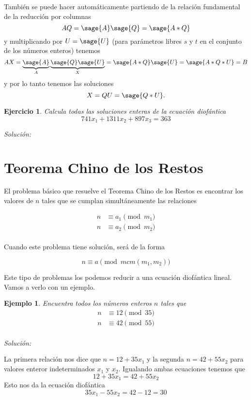 \documentclass{amsart}
\newtheorem{ejer}{Ejercicio}
\newtheorem{ejem}{Ejemplo}
\begin{document}
También se puede hacer automáticamente partiendo de la relación fundamental 
de la reducción por columnas
$$ AQ = \sage{A} \sage{Q} = \sage{A*Q} $$
y multiplicando por $U = \sage{U}$ (para parámetros libres $s$ y $t$ en el conjunto de los números enteros) tenemos
$$ AX = \underbrace{\sage{A}}_A \underbrace{\sage{Q} \sage{U}}_X = \sage{A*Q} \sage{U} = \sage{A*Q*U} = B$$
y por lo tanto tenemos las soluciones
$$ X = QU = \sage{Q*U}.$$


\begin{ejer}
Calcula todas las soluciones enteras de la ecuación diofántica
$$ 741 x_1 + 1311 x_2 + 897 x_3 = 363$$
\end{ejer}

{\it Solución:}


\section{Teorema Chino de los Restos}

El problema básico que resuelve el Teorema Chino de los Restos es encontrar los
valores de $n$ tales que se cumplan simultáneamente las relaciones

\begin{align*}
n &\equiv a_1 \pmod{m_1} \\
n &\equiv a_2 \pmod{m_2} \\
\end{align*}

Cuando este problema tiene solución, será de la forma

$$ n \equiv a \pmod{mcm(m_1,m_2)} $$

Este tipo de problemas los podemos reducir a una ecuación diofántica lineal. 
Vamos a verlo con un ejemplo.

\begin{ejem}
\label{EjemDiof2}
Encuentra todos los números enteros $n$ tales que 
\begin{align*}
n &\equiv 12 \pmod{35} \\
n &\equiv 42 \pmod{55} \\
\end{align*}
\end{ejem}

{\it Solución:}

La primera relación nos dice que $n = 12+35x_1$ y la segunda $n = 42+55x_2$
para valores enteror indeterminados $x_1$ y $x_2$. Igualando ambas ecuaciones
tenemos que $$ 12+35x_1 = 42+55x_2$$
Esto nos da la ecuación diofántica
$$ 35x_1 - 55 x_2 = 42-12 = 30 $$
\end{document}
